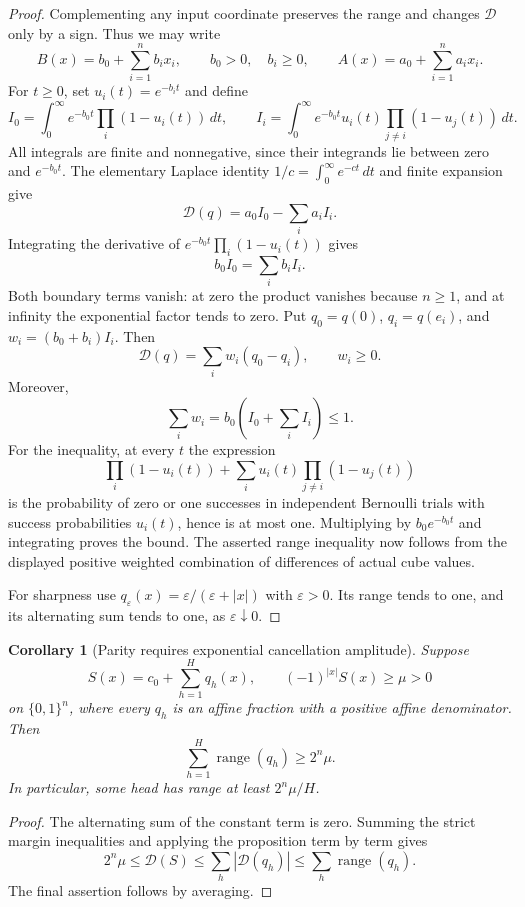 \documentclass[11pt]{article}
\newtheorem{corollary}[proposition]{Corollary}
\begin{document}
\begin{proof}
Complementing any input coordinate preserves the range and changes
$\mathcal D$ only by a sign. Thus we may write
\[
 B(x)=b_0+\sum_{i=1}^n b_ix_i,\qquad b_0>0,\quad b_i\geq0,
 \qquad A(x)=a_0+\sum_{i=1}^n a_ix_i.
\]
For $t\geq0$, set $u_i(t)=e^{-b_it}$ and define
\[
 I_0=\int_0^\infty e^{-b_0t}\prod_i(1-u_i(t))\,dt,\qquad
 I_i=\int_0^\infty e^{-b_0t}u_i(t)
                    \prod_{j\neq i}(1-u_j(t))\,dt.
\]
All integrals are finite and nonnegative, since their integrands lie
between zero and $e^{-b_0t}$. The elementary Laplace identity
$1/c=\int_0^\infty e^{-ct}\,dt$ and finite expansion give
\[
 \mathcal D(q)=a_0I_0-\sum_i a_iI_i.
\]
Integrating the derivative of
$e^{-b_0t}\prod_i(1-u_i(t))$ gives
\[
 b_0I_0=\sum_i b_iI_i.
\]
Both boundary terms vanish: at zero the product vanishes because
$n\geq1$, and at infinity the exponential factor tends to zero.
Put $q_0=q(0)$, $q_i=q(e_i)$, and $w_i=(b_0+b_i)I_i$. Then
\[
 \mathcal D(q)=\sum_iw_i(q_0-q_i),\qquad w_i\geq0.
\]
Moreover,
\[
 \sum_iw_i=b_0\left(I_0+\sum_iI_i\right)\leq1.
\]
For the inequality, at every $t$ the expression
\[
 \prod_i(1-u_i(t))+\sum_i u_i(t)\prod_{j\neq i}(1-u_j(t))
\]
is the probability of zero or one successes in independent Bernoulli
trials with success probabilities $u_i(t)$, hence is at most one.
Multiplying by $b_0e^{-b_0t}$ and integrating proves the bound.
The asserted range inequality now follows from the displayed positive
weighted combination of differences of actual cube values.

For sharpness use
$q_\varepsilon(x)=\varepsilon/(\varepsilon+|x|)$ with $\varepsilon>0$.
Its range tends to one, and its alternating sum tends to one, as
$\varepsilon\downarrow0$.
\end{proof}

\begin{corollary}[Parity requires exponential cancellation amplitude]
Suppose
\[
 S(x)=c_0+\sum_{h=1}^Hq_h(x),\qquad
 (-1)^{|x|}S(x)\geq\mu>0
\]
on $\{0,1\}^n$, where every $q_h$ is an affine fraction with a
positive affine denominator. Then
\[
 \sum_{h=1}^H\operatorname{range}(q_h)\geq2^n\mu.
\]
In particular, some head has range at least $2^n\mu/H$.
\end{corollary}

\begin{proof}
The alternating sum of the constant term is zero. Summing the strict
margin inequalities and applying the proposition term by term gives
\[
 2^n\mu\leq\mathcal D(S)
     \leq\sum_h|\mathcal D(q_h)|
     \leq\sum_h\operatorname{range}(q_h).
\]
The final assertion follows by averaging.
\end{proof}
\end{document}
